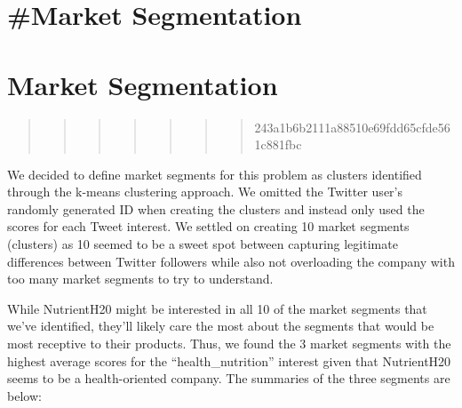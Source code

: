 \documentclass[
]{article}
\begin{document}
\hypertarget{market-segmentation}{%
\section{\#Market Segmentation}\label{market-segmentation}}

\hypertarget{market-segmentation-1}{%
\section{Market Segmentation}\label{market-segmentation-1}}

\begin{quote}
\begin{quote}
\begin{quote}
\begin{quote}
\begin{quote}
\begin{quote}
\begin{quote}
243a1b6b2111a88510e69fdd65cfde561c881fbc
\end{quote}
\end{quote}
\end{quote}
\end{quote}
\end{quote}
\end{quote}
\end{quote}

We decided to define market segments for this problem as clusters
identified through the k-means clustering approach. We omitted the
Twitter user's randomly generated ID when creating the clusters and
instead only used the scores for each Tweet interest. We settled on
creating 10 market segments (clusters) as 10 seemed to be a sweet spot
between capturing legitimate differences between Twitter followers while
also not overloading the company with too many market segments to try to
understand.

While NutrientH20 might be interested in all 10 of the market segments
that we've identified, they'll likely care the most about the segments
that would be most receptive to their products. Thus, we found the 3
market segments with the highest average scores for the
``health\_nutrition'' interest given that NutrientH20 seems to be a
health-oriented company. The summaries of the three segments are below:
\end{document}

